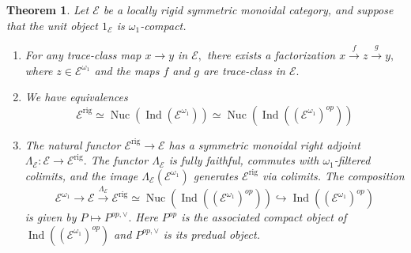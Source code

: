 \documentclass[11pt,leqno]{amsart}
\newtheorem{theo}{Theorem}[section]
\numberwithin{equation}{section}
\newcommand{\xto}{\xrightarrow}
\newcommand{\hto}{\hookrightarrow}
\newcommand{\rig}{\operatorname{rig}}
\newcommand{\Nuc}{\operatorname{Nuc}}
\newcommand{\cE}{{\mathcal E}}
\newcommand{\Ind}{\operatorname{Ind}}
\begin{document}
\begin{theo}\label{th:rigidification_of_locally_rigid_countable} Let $\cE$ be a locally rigid symmetric monoidal category, and suppose that the unit object $1_{\cE}$ is $\omega_1$-compact. 
\begin{enumerate}[label=(\roman*),ref=(\roman*)]
\item For any trace-class map $x\to y$ in $\cE,$ there exists a factorization $x\xto{f} z\xto{g} y,$ where $z\in\cE^{\omega_1}$ and the maps $f$ and $g$ are trace-class in $\cE.$ \label{trace_class_decomposes_in_locally_rigid}
\item We have equivalences
\begin{equation*}
\cE^{\rig}\simeq \Nuc(\Ind(\cE^{\omega_1}))\simeq \Nuc(\Ind((\cE^{\omega_1})^{op}))
\end{equation*} \label{rigidification_as_nuclear}
\item The natural functor $\cE^{\rig}\to\cE$ has a symmetric monoidal right adjoint $\Lambda_{\cE}:\cE\to\cE^{\rig}.$ The functor $\Lambda_{\cE}$ is fully faithful, commutes with $\omega_1$-filtered colimits, and the image $\Lambda_{\cE}(\cE^{\omega_1})$ generates $\cE^{\rig}$ via colimits. The composition
\begin{equation}\label{eq:composition_from_E_to_Ind_E_op}
\cE^{\omega_1}\to\cE\xto{\Lambda_{\cE}}\cE^{\rig}\simeq \Nuc(\Ind((\cE^{\omega_1})^{op}))\hto \Ind((\cE^{\omega_1})^{op})
\end{equation}
is given by $P\mapsto P^{op,\vee}.$ Here $P^{op}$ is the associated compact object of $\Ind((\cE^{\omega_1})^{op})$ and $P^{op,\vee}$ is its predual object. \label{right_adjoint_to_E^rig_to_E}
\end{enumerate}
\end{theo}
\end{document}

